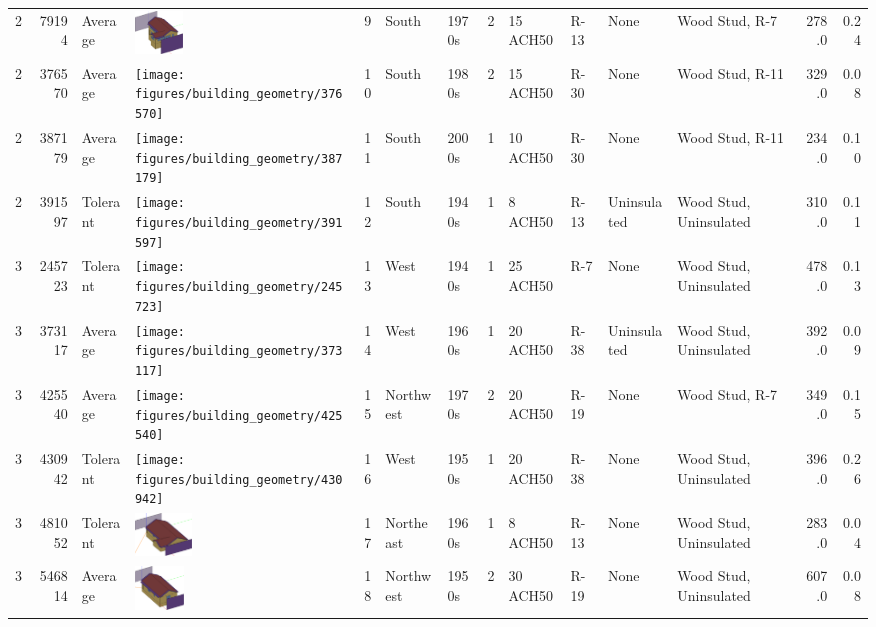 \begin{tabular}{rrllrlllllllrr}
 2 & 79194 & Average & {\includegraphics[height=0.45in]{figures/building_geometry/79194}} & 9 & South & 1970s & 2 & 15 ACH50 & R-13 & None & Wood Stud, R-7 & 278.0 & 0.24 \\
 2 & 376570 & Average & {\texttt{[image: figures/building\_geometry/376570]}} & 10 & South & 1980s & 2 & 15 ACH50 & R-30 & None & Wood Stud, R-11 & 329.0 & 0.08 \\
 2 & 387179 & Average & {\texttt{[image: figures/building\_geometry/387179]}} & 11 & South & 2000s & 1 & 10 ACH50 & R-30 & None & Wood Stud, R-11 & 234.0 & 0.10 \\
 2 & 391597 & Tolerant & {\texttt{[image: figures/building\_geometry/391597]}} & 12 & South & 1940s & 1 & 8 ACH50 & R-13 & Uninsulated & Wood Stud, Uninsulated & 310.0 & 0.11 \\
 3 & 245723 & Tolerant & {\texttt{[image: figures/building\_geometry/245723]}} & 13 & West & 1940s & 1 & 25 ACH50 & R-7 & None & Wood Stud, Uninsulated & 478.0 & 0.13 \\
 3 & 373117 & Average & {\texttt{[image: figures/building\_geometry/373117]}} & 14 & West & 1960s & 1 & 20 ACH50 & R-38 & Uninsulated & Wood Stud, Uninsulated & 392.0 & 0.09 \\
 3 & 425540 & Average & {\texttt{[image: figures/building\_geometry/425540]}} & 15 & Northwest & 1970s & 2 & 20 ACH50 & R-19 & None & Wood Stud, R-7 & 349.0 & 0.15 \\
 3 & 430942 & Tolerant & {\texttt{[image: figures/building\_geometry/430942]}} & 16 & West & 1950s & 1 & 20 ACH50 & R-38 & None & Wood Stud, Uninsulated & 396.0 & 0.26 \\
 3 & 481052 & Tolerant & {\includegraphics[height=0.45in]{figures/building_geometry/481052}} & 17 & Northeast & 1960s & 1 & 8 ACH50 & R-13 & None & Wood Stud, Uninsulated & 283.0 & 0.04 \\
 3 & 546814 & Average & {\includegraphics[height=0.45in]{figures/building_geometry/546814}} & 18 & Northwest & 1950s & 2 & 30 ACH50 & R-19 & None & Wood Stud, Uninsulated & 607.0 & 0.08 \\

\end{tabular}
